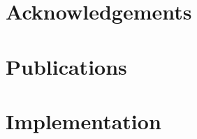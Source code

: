 \documentclass[a4paper]{report}
\begin{document}

\chapter*{Acknowledgements}

\chapter*{Publications}

\begin{abstract}
\end{abstract}

\tableofcontents

\listoffigures

\listoftables
{}









\chapter{Implementation}
\label{ch:implementation}
\end{document}
